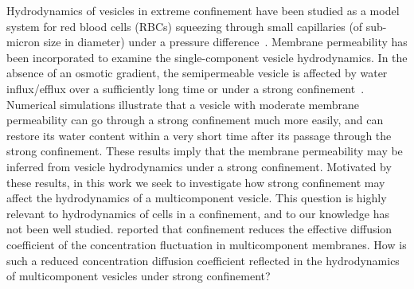 \documentclass[twoside,twocolumn,9pt]{article}
\begin{document}
%
%
%

Hydrodynamics of vesicles in extreme confinement have been studied as a
model system for red blood cells (RBCs) squeezing through small
capillaries (of sub-micron size in diameter) under a pressure
difference~\cite{Freund2013_PoF, LuPeng2019_PoF, che-lyu-jae-leo2020,
gur-pak-tay-siv-sac2023, wu2013simulation}. Membrane permeability has
been incorporated to examine the single-component vesicle hydrodynamics.
In the absence of an osmotic gradient, the semipermeable vesicle is
affected by water influx/efflux over a sufficiently long time or under a
strong confinement~\cite{qua-gan-you2021}. Numerical simulations
illustrate that a vesicle with moderate membrane permeability can go
through a strong confinement much more easily, and can restore its water
content within a very short time after its passage through the strong
confinement. These results imply that the membrane permeability may be
inferred from vesicle hydrodynamics under a strong confinement.
Motivated by these results, in this work we seek to investigate how
strong confinement may affect the hydrodynamics of a multicomponent
vesicle. This question is highly relevant to hydrodynamics of cells in a
confinement, and to our knowledge has not been well studied.
\citet{ram-kom-sek-ima2010} reported that confinement reduces the
effective diffusion coefficient of the concentration fluctuation in
multicomponent membranes. How is such a reduced concentration diffusion
coefficient reflected in the hydrodynamics of multicomponent vesicles
under strong confinement?
\end{document}
